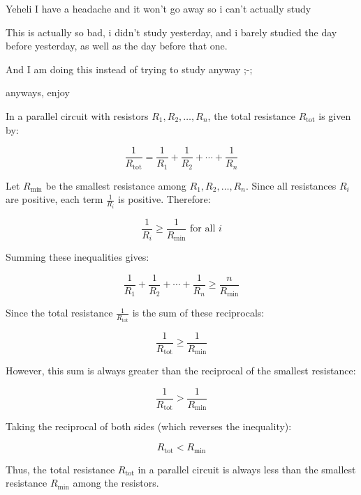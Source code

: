 \documentclass{article}
\begin{document}
Yeheli I have a headache and it won't go away so i can't actually study

This is actually so bad, i didn't study yesterday, and i barely studied the day before yesterday, as well as the day before that one.

And I am doing this instead of trying to study anyway ;-;


anyways, enjoy


In a parallel circuit with resistors \( R_1, R_2, \ldots, R_n \), the total resistance \( R_{\text{tot}} \) is given by:

\[
\frac{1}{R_{\text{tot}}} = \frac{1}{R_1} + \frac{1}{R_2} + \cdots + \frac{1}{R_n}
\]

Let \( R_{\text{min}} \) be the smallest resistance among \( R_1, R_2, \ldots, R_n \). Since all resistances \( R_i \) are positive, each term \( \frac{1}{R_i} \) is positive. Therefore:

\[
\frac{1}{R_i} \geq \frac{1}{R_{\text{min}}} \text{ for all } i
\]

Summing these inequalities gives:

\[
\frac{1}{R_1} + \frac{1}{R_2} + \cdots + \frac{1}{R_n} \geq \frac{n}{R_{\text{min}}}
\]

Since the total resistance \( \frac{1}{R_{\text{tot}}} \) is the sum of these reciprocals:

\[
\frac{1}{R_{\text{tot}}} \geq \frac{1}{R_{\text{min}}}
\]

However, this sum is always greater than the reciprocal of the smallest resistance:

\[
\frac{1}{R_{\text{tot}}} > \frac{1}{R_{\text{min}}}
\]

Taking the reciprocal of both sides (which reverses the inequality):

\[
R_{\text{tot}} < R_{\text{min}}
\]

Thus, the total resistance \( R_{\text{tot}} \) in a parallel circuit is always less than the smallest resistance \( R_{\text{min}} \) among the resistors.
\end{document}
